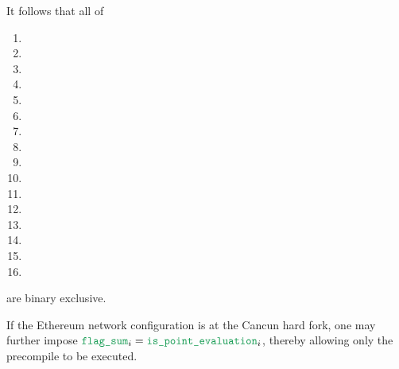 \saNote{} \label{bls: generalities: flag sum: binary exclusivity}
It follows that all of
\begin{multicols}{2}
	\begin{enumerate}
		\item \isPointEvaluationData{}
		\item \isBlsGOneAddData{}
		\item \isBlsGOneMsmData{}
		\item \isBlsGTwoAddData{}
		\item \isBlsGTwoMsmData{}
		\item \isBlsPairingCheckData{}
		\item \isBlsMapFpToGOneData{}
		\item \isBlsMapFpTwoToGTwoData{}
		\item \isPointEvaluationResult{}
		\item \isBlsGOneAddResult{}
		\item \isBlsGOneMsmResult{}
		\item \isBlsGTwoAddResult{}
		\item \isBlsGTwoMsmResult{}
		\item \isBlsPairingCheckResult{}
		\item \isBlsMapFpToGOneResult{}
		\item \isBlsMapFpTwoToGTwoResult{}
	\end{enumerate}
\end{multicols}
\noindent are binary exclusive.

\saNote{} \label{bls: generalities: flag sum: only allow point evaluation for Cancun}
If the Ethereum network configuration is at the Cancun hard fork, one may further impose $\locFlagSum _{i} = \locIsPointEvaluation _{i}$,
thereby allowing only the  precompile to be executed.